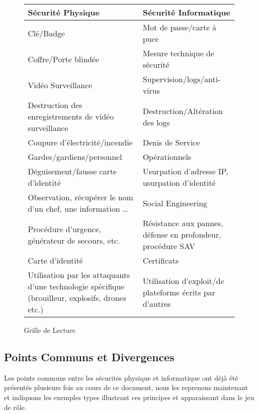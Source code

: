 \documentclass[11pt]{article} %
\begin{document}
\begin{figure}
    \begin{tabularx}{\textwidth}{|X|X|}
    \hline
Sécurité Physique & Sécurité Informatique \\ \hline
Clé/Badge & Mot de passe/carte à puce \\
Coffre/Porte blindée & Mesure technique de sécurité \\
Vidéo Surveillance & Supervision/logs/anti-virus \\
Destruction des enregistrements de vidéo surveillance & Destruction/Altération
des logs \\
Coupure d'électricité/incendie	                        & Denis de Service \\    
Gardes/gardiens/personnel	                            & Opérationnels \\
Déguisement/fausse carte d'identité & Usurpation d'adresse IP, usurpation
d'identité \\
Observation, récupérer le nom d'un chef, une information … & Social Engineering
\\
Procédure d'urgence, générateur de secours, etc. & Résistance aux pannes,
défense en profondeur, procédure SAV \\
    Carte d'identité 	                                    & Certificats \\
Utilisation par les attaquants d'une technologie spécifique (brouilleur,
explosifs, drones etc.) & Utilisation d'exploit/de plateforme écrits par
d'autres \\ \hline
    \end{tabularx}
    \caption{Grille de Lecture}
\end{figure}

\subsection{Points Communs et Divergences}

Les points communs entre les sécurités physique et informatique ont déjà été
présentés plusieurs fois au cours de ce document, nous les reprenons maintenant
et indiquons les exemples types illustrant ces principes et apparaissant dans le
jeu de rôle.
\end{document}
